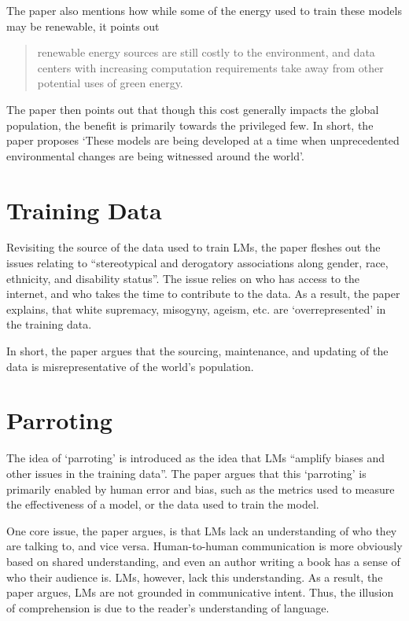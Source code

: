 \documentclass[12pt]{article}
\begin{document}
The paper also mentions how while some of the energy used to train these models
may be renewable, it points out

\begin{quote}
    renewable energy sources are still costly to the environment, and data
    centers with increasing computation requirements take away from other
    potential uses of green energy.
\end{quote}

The paper then points out that though this cost generally impacts the global
population, the benefit is primarily towards the privileged few. In short, the
paper proposes `These models are being developed at a time when unprecedented
environmental changes are being witnessed around the world'.

\section*{Training Data}
Revisiting the source of the data used to train LMs, the paper fleshes out the
issues relating to ``stereotypical and derogatory associations along gender,
race, ethnicity, and disability status''. The issue relies on who has access to
the internet, and who takes the time to contribute to the data. As a result, the
paper explains, that white supremacy, misogyny, ageism, etc. are `overrepresented' in
the training data.

In short, the paper argues that the sourcing, maintenance, and updating of the
data is misrepresentative of the world's population.

\section*{Parroting}
The idea of `parroting' is introduced as the idea that LMs ``amplify biases and
other issues in the training data''. The paper argues that this `parroting' is
primarily enabled by human error and bias, such as the metrics used to measure
the effectiveness of a model, or the data used to train the model.

One core issue, the paper argues, is that LMs lack an understanding of who they
are talking to, and vice versa. Human-to-human communication is more obviously
based on shared understanding, and even an author writing a book has a sense of
who their audience is. LMs, however, lack this understanding. As a result, the
paper argues, LMs are not grounded in communicative intent. Thus, the
illusion of comprehension is due to the reader's understanding of language.
\end{document}
